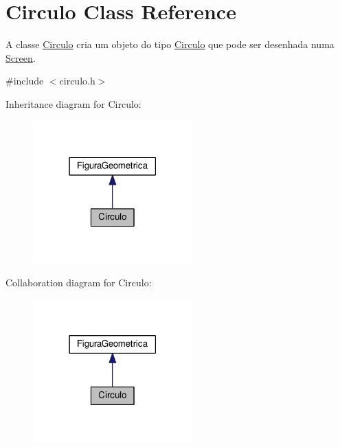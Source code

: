 \hypertarget{class_circulo}{}\section{Circulo Class Reference}
\label{class_circulo}


A classe \hyperlink{class_circulo}{Circulo} cria um objeto do tipo \hyperlink{class_circulo}{Circulo} que pode ser desenhada numa \hyperlink{class_screen}{Screen}.  




{\ttfamily \#include $<$circulo.\+h$>$}



Inheritance diagram for Circulo\+:
\nopagebreak
\begin{figure}[H]
\begin{center}
\leavevmode
\includegraphics[width=174pt]{class_circulo__inherit__graph}
\end{center}
\end{figure}


Collaboration diagram for Circulo\+:
\nopagebreak
\begin{figure}[H]
\begin{center}
\leavevmode
\includegraphics[width=174pt]{class_circulo__coll__graph}
\end{center}
\end{figure}
